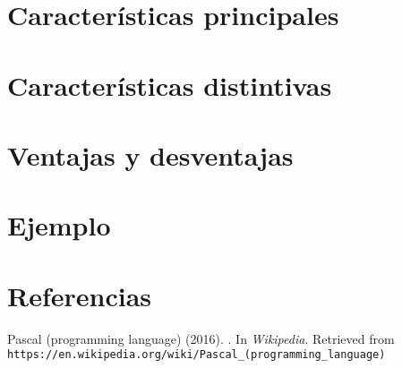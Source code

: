 \documentclass{IEEEtran}
\begin{document}
\section{Caracter\'isticas principales}
\section{Caracter\'isticas distintivas}
\section{Ventajas y desventajas}
\section{Ejemplo}

\section{Referencias}

\begin{thebibliography}{99}

 Pascal (programming language) (2016). . In \emph{Wikipedia}. Retrieved from \texttt{https://en.wikipedia.org/wiki/Pascal_(programming_language)}

\end{thebibliography}
\end{document}
